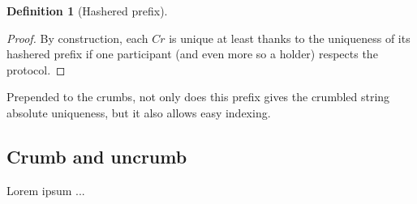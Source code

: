 \documentclass[twoside,twocolumn]{article}
\theoremstyle{definition}
\newtheorem{definition}{Definition}
\theoremstyle{remark}
\begin{document}
\begin{definition}[Hashered prefix]
\begin{proof}
        By construction, each $Cr$ is unique at least thanks to the uniqueness of its hashered prefix if one participant (and even more so a holder) 
        respects the protocol.
    \end{proof}
\end{definition}

Prepended to the crumbs, not only does this prefix gives the crumbled string absolute uniqueness, but it also allows easy indexing.

\subsection{Crumb and uncrumb}

Lorem ipsum ... %



%
%

\end{document}
